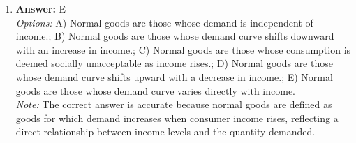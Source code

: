 \documentclass[12pt]{article}
\begin{document}
\begin{enumerate}[label=\arabic*.]
\item \textbf{Answer:} E
\\ \textit{Options:} A) Normal goods are those whose demand is independent of income.; B) Normal goods are those whose demand curve shifts downward with an increase in income.; C) Normal goods are those whose consumption is deemed socially unacceptable as income rises.; D) Normal goods are those whose demand curve shifts upward with a decrease in income.; E) Normal goods are those whose demand curve varies directly with income.
\\ \textit{Note:} The correct answer is accurate because normal goods are defined as goods for which demand increases when consumer income rises, reflecting a direct relationship between income levels and the quantity demanded.
\end{enumerate}
\end{document}
